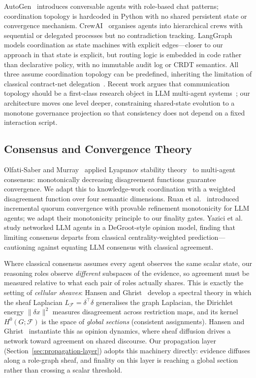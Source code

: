 \documentclass[11pt]{article}
\begin{document}
AutoGen~\cite{wu2023autogen} introduces conversable agents with role-based chat patterns; coordination topology is hardcoded in Python with no shared persistent state or convergence mechanism.
CrewAI~\cite{crewai2024} organises agents into hierarchical crews with sequential or delegated processes but no contradiction tracking.
LangGraph~\cite{langgraph2024} models coordination as state machines with explicit edges---closer to our approach in that state is explicit, but routing logic is embedded in code rather than declarative policy, with no immutable audit log or CRDT semantics.
All three assume coordination topology can be predefined, inheriting the limitation of classical contract-net delegation~\cite{smith1988}.
Recent work argues that communication topology should be a first-class research object in LLM multi-agent systems~\cite{topologylearning2025}; our architecture moves one level deeper, constraining shared-state evolution to a monotone governance projection so that consistency does not depend on a fixed interaction script.

\subsection{Consensus and Convergence Theory}

Olfati-Saber and Murray~\cite{olfati2004} applied Lyapunov stability theory~\cite{lyapunov1892} to multi-agent consensus: monotonically decreasing disagreement functions guarantee convergence.
We adapt this to knowledge-work coordination with a weighted disagreement function over four semantic dimensions.
Ruan et al.~\cite{ruan2025} introduced incremental quorum convergence with provable refinement monotonicity for LLM agents; we adapt their monotonicity principle to our finality gates.
Yazici et al.~\cite{yazici2026opinion} study networked LLM agents in a DeGroot-style opinion model, finding that limiting consensus departs from classical centrality-weighted prediction---cautioning against equating LLM consensus with classical agreement.

Where classical consensus assumes every agent observes the same scalar state, our reasoning roles observe \emph{different} subspaces of the evidence, so agreement must be measured relative to what each pair of roles actually shares. This is exactly the setting of \emph{cellular sheaves}: Hansen and Ghrist~\cite{ghrist2022} develop a spectral theory in which the sheaf Laplacian $L_{\mathcal{F}} = \delta^\top\delta$ generalises the graph Laplacian, the Dirichlet energy $\|\delta x\|^2$ measures disagreement across restriction maps, and its kernel $H^0(G;\mathcal{F})$ is the space of \emph{global sections} (consistent assignments). Hansen and Ghrist~\cite{hansen2021opinion} instantiate this as opinion dynamics, where sheaf diffusion drives a network toward agreement on shared discourse. Our propagation layer (Section~\ref{sec:propagation-layer}) adopts this machinery directly: evidence diffuses along a role-graph sheaf, and finality on this layer is reaching a global section rather than crossing a scalar threshold.
\end{document}
